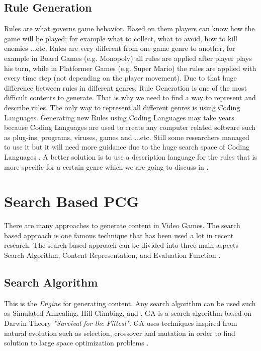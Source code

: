 \subsection{Rule Generation}
Rules are what governs game behavior. Based on them players can know how the game will be played; for example what to collect, what to avoid, how to kill enemies ...etc. Rules are very different from one game genre to another, for example in Board Games (e.g. Monopoly) all rules are applied after player plays his turn, while in Platformer Games (e.g. Super Mario) the rules are applied with every time step (not depending on the player movement). Due to that huge difference between rules in different genres, Rule Generation is one of the most difficult contents to generate. That is why we need to find a way to represent and describe rules. The only way to represent all different genres is using Coding Languages. Generating new Rules using Coding Languages may take years because Coding Languages are used to create any computer related software such as plug-ins, programs, viruses, games and ...etc. Still some researchers managed to use it but it will need more guidance due to the huge search space of Coding Languages \cite{mechanicMiner}. A better solution is to use a description language for the rules that is more specific for a certain genre which we are going to discuss in  \cite{pcgBookRules}.
 
\section{Search Based PCG}
There are many approaches to generate content in Video Games. The search based approach is one famous technique that has been used a lot in recent research. The search based approach can be divided into three main aspects Search Algorithm, Content Representation, and Evaluation Function \cite{pcgBookSearch}.

\subsection{Search Algorithm}
This is the \emph{Engine} for generating content. Any search algorithm can be used such as Simulated Annealing, Hill Climbing, and . GA is a search algorithm based on Darwin Theory \textit{"Survival for the Fittest"}. GA uses techniques inspired from natural evolution such as selection, crossover and mutation in order to find solution to large space optimization problems \cite{geneticAlgorithm}.

